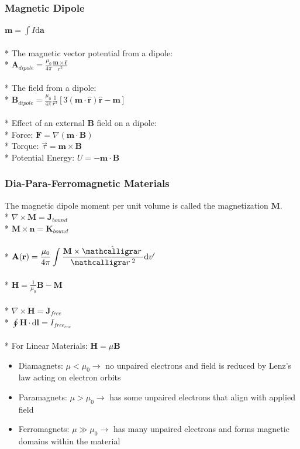 \subsubsection{Magnetic Dipole}
\(\mathbf{m} =\int I\mathrm{d}\mathbf{a}\)\\\\*
The magnetic vector potential from a dipole:\\*
\(\displaystyle\mathbf{A}_{dipole}=\frac{\mu_0}{4\pi}\frac{\mathbf{m}\times\hat{\mathbf{r}}}{r^2}\)\\\\*
The field from a dipole:\\*
\(\displaystyle \mathbf{B}_{dipole}=\frac{\mu_0}{4\pi}\frac{1}{r^3}\left[3\left(\mathbf{m}\cdot\hat{\mathbf{r}}\right)\hat{\mathbf{r}}-\mathbf{m}\right]\)\\\\*
Effect of an external \(\mathbf{B}\) field on a dipole:\\*
Force: \(\mathbf{F}=\nabla(\mathbf{m}\cdot\mathbf{B})\)\\*
Torque: \(\vec{\tau}=\mathbf{m}\times\mathbf{B}\)\\*
Potential Energy: \(U=-\mathbf{m}\cdot\mathbf{B}\)

\subsubsection{Dia-Para-Ferromagnetic Materials}
The magnetic dipole moment per unit volume is called the magnetization \(\mathbf{M}\).\\*
\(\nabla\times\mathbf{M}=\mathbf{J}_{bound}\)\\*
\(\mathbf{M}\times\hat{\mathbf{n}}=\mathbf{K}_{bound}\)\\\\*
\(\displaystyle\mathbf{A}(\mathbf{r})=\frac{\mu_0}{4\pi}\int\frac{\mathbf{M}\times\hat{\scriptr}}{\scriptr^2}\mathrm{d}v'\)\\\\*
\(\displaystyle\mathbf{H}=\frac{1}{\mu_0}\mathbf{B}-\mathbf{M}\)\\\\*
\(\nabla\times\mathbf{H}=\mathbf{J}_{free}\)\\*
\(\displaystyle\oint\mathbf{H}\cdot\mathrm{d}\mathbf{l}=I_{free_{enc}}\)\\\\*
For Linear Materials: \(\mathbf{H}=\mu\mathbf{B}\)
\begin{itemize}
\item Diamagnets: \(\mu < \mu_0\to\) no unpaired electrons and field is reduced by Lenz's law acting on electron orbits
\item Paramagnets: \(\mu > \mu_0\to\) has some unpaired electrons that align with applied field
\item Ferromagnets: \(\mu \gg \mu_0\to\) has many unpaired electrons and forms magnetic domains within the material
\end{itemize}

